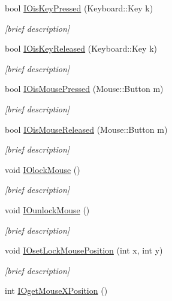 \begin{DoxyCompactItemize}
\item 
bool \hyperlink{class_i_s_e_a5c48de8d0d22cd4fa08f3ee5dca77eb9}{I\-Ois\-Key\-Pressed} (Keyboard\-::\-Key k)
\begin{DoxyCompactList}\small\item\em \mbox{[}brief description\mbox{]} \end{DoxyCompactList}\item 
bool \hyperlink{class_i_s_e_a0b650a4d6cc0fa8cd70f66be985f929b}{I\-Ois\-Key\-Released} (Keyboard\-::\-Key k)
\begin{DoxyCompactList}\small\item\em \mbox{[}brief description\mbox{]} \end{DoxyCompactList}\item 
bool \hyperlink{class_i_s_e_a0e5cfd21f7f37d2cfc1c0ccad6ce5e12}{I\-Ois\-Mouse\-Pressed} (Mouse\-::\-Button m)
\begin{DoxyCompactList}\small\item\em \mbox{[}brief description\mbox{]} \end{DoxyCompactList}\item 
bool \hyperlink{class_i_s_e_a50ecdecf1809907d1f2dccae7d85c3e5}{I\-Ois\-Mouse\-Released} (Mouse\-::\-Button m)
\begin{DoxyCompactList}\small\item\em \mbox{[}brief description\mbox{]} \end{DoxyCompactList}\item 
void \hyperlink{class_i_s_e_af5cdbfd74c5da50ad53ac90618b6bfbe}{I\-Olock\-Mouse} ()
\begin{DoxyCompactList}\small\item\em \mbox{[}brief description\mbox{]} \end{DoxyCompactList}\item 
void \hyperlink{class_i_s_e_a1fa48a4c97ca6b3ff2eac4bbc674e106}{I\-Ounlock\-Mouse} ()
\begin{DoxyCompactList}\small\item\em \mbox{[}brief description\mbox{]} \end{DoxyCompactList}\item 
void \hyperlink{class_i_s_e_ac476e53b1c7fb6ef168fc5de0eb89988}{I\-Oset\-Lock\-Mouse\-Position} (int x, int y)
\begin{DoxyCompactList}\small\item\em \mbox{[}brief description\mbox{]} \end{DoxyCompactList}\item 
int \hyperlink{class_i_s_e_a74fd5406b106ec927470bc7329abe38e}{I\-Oget\-Mouse\-X\-Position} ()

\end{DoxyCompactItemize}
